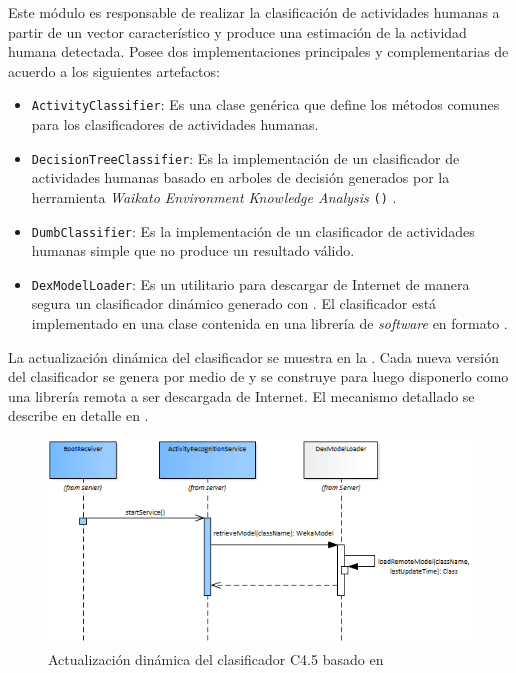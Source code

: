 Este módulo es responsable de realizar la clasificación de actividades
humanas a partir de un vector característico y produce una estimación
de la actividad humana detectada. Posee dos implementaciones principales
y complementarias de acuerdo a los siguientes artefactos:
\begin{itemize}
\item \texttt{\small{}ActivityClassifier}: Es una clase genérica que define
los métodos comunes para los clasificadores de actividades humanas.
\item \texttt{\small{}DecisionTreeClassifier}: Es la implementación de un
clasificador de actividades humanas basado en arboles de decisión
generados por la herramienta \emph{Waikato Environment Knowledge Analysis}
\texttt{()} \cite{Frank2016}.
\item \texttt{\small{}DumbClassifier}: Es la implementación de un clasificador
de actividades humanas simple que no produce un resultado válido.
\item \texttt{\small{}DexModelLoader}: Es un utilitario para descargar de
Internet de manera segura un clasificador dinámico generado con .
El clasificador está implementado en una clase contenida en una librería
de \emph{software} en formato .
\end{itemize}
La actualización dinámica del clasificador se muestra en la .
Cada nueva versión del clasificador se genera por medio de 
y se construye para luego disponerlo como una librería remota a ser
descargada de Internet. El mecanismo detallado se describe en detalle
en \cite{Falsina2014}.

\begin{figure}[H]
\begin{centering}
\includegraphics[width=1\columnwidth]{capitulo-5/graphics/service_classi}
\par\end{centering}
\caption[Actualización del clasificador C4.5]{\label{fig5:service-classi}Actualización dinámica del clasificador
C4.5 basado en }
\end{figure}


